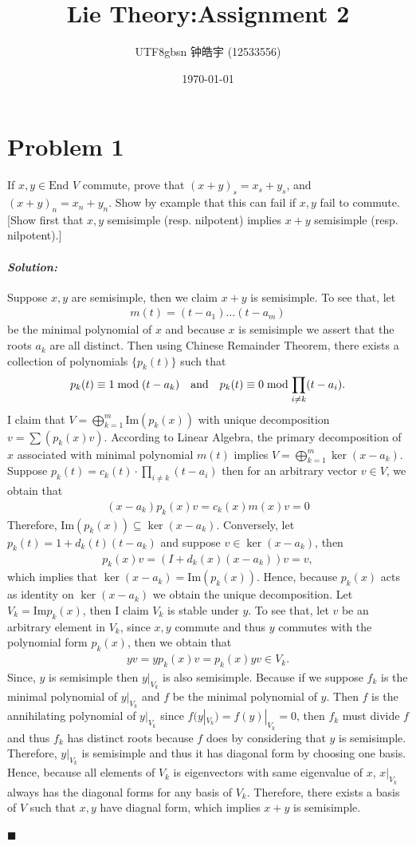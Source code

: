 \documentclass[12pt, a4paper]{article}
\title{Lie Theory:Assignment 2}
\author{
    \begin{CJK*}{UTF8}{gbsn}
    钟皓宇 (12533556)
    \end{CJK*}
}
\date{\today}
\newenvironment{solution}
  {\paragraph{\textit{Solution:}}\par\medskip}
  {\hfill$\blacksquare$\vspace{0.1cm}}
\begin{document}
\maketitle
\section*{Problem 1}
If $x, y \in \text{End } V$ commute, prove that $(x+y)_s = x_s + y_s$, and $(x+y)_n = x_n + y_n$. Show by example that this can fail if $x, y$ fail to commute. [Show first that $x, y$ semisimple (resp. nilpotent) implies $x + y$ semisimple (resp. nilpotent).]
\begin{solution}
Suppose $x,y$ are semisimple, then we claim $x+y$ is semisimple. To see that, let 
\begin{align*}
  m(t) =  (t-a_1)\dots(t-a_m)
\end{align*} 
be the minimal polynomial of $x$ and because $x$ is semisimple we assert that the roots $a_k$ are all distinct. Then using Chinese Remainder Theorem, there exists a collection of polynomials $\{p_k(t)\}$ such that 
\begin{align*}
  p_k(t)\equiv 1 \bmod (t-a_k) \text{\quad and\quad} p_k(t) \equiv 0 \bmod \prod_{i\neq k} (t-a_i).
\end{align*}
I claim that $V = \bigoplus_{k=1}^m \text{Im}(p_k(x))$ with unique decomposition $v = \sum (p_k(x)v)$. 
According to Linear Algebra, the primary decomposition of $x$ associated with minimal polynomial $m(t)$ 
implies $V=  \bigoplus_{k=1}^m \ker(x-a_k)$. Suppose $p_k(t) = c_k(t)\cdot\prod_{i\neq k} (t-a_i)$ then for an arbitrary vector $v\in V$, we obtain that
\begin{align*}
  (x-a_k)p_k(x)v  =c_k(x)m(x)v=0 
\end{align*}
Therefore, $\text{Im}(p_k(x))\subseteq \ker(x-a_k)$. Conversely, let $p_k(t) = 1+d_k(t)(t-a_k)$ and suppose $v\in\ker(x-a_k)$, then 
\begin{align*}
  p_k(x)v = (I+d_k(x)(x-a_k))v = v,
\end{align*}
which implies that $\ker(x-a_k)=\text{Im}(p_k(x))$. Hence, because $p_k(x)$ acts as identity on $\ker(x-a_k)$ we obtain the unique decomposition.
Let $V_k = \text{Im}p_k(x)$, then I claim $V_k$ is stable under $y$. To see that, let $v$ be an arbitrary element in $V_k$,
since $x,y$ commute and thus $y$ commutes with the polynomial form $p_k(x)$, then
we obtain that 
\begin{align*}
  yv = yp_k(x)v = p_k(x)yv\in V_k.
\end{align*}
Since, $y$ is semisimple then $y|_{V_k}$ is also semisimple. Because if we suppose $f_k$ is the minimal polynomial of $y|_{V_k}$ and $f$ be the minimal polynomial of $y$.
Then $f$ is the annihilating polynomial of $y|_{V_k}$ since $f(y|_{V_k})=f(y)|_{V_k}=0$, then $f_k$ must divide $f$ and thus $f_k$ has distinct roots because $f$ does by considering 
that $y$ is semisimple. Therefore, $y|_{V_k}$ is semisimple and thus it has diagonal form by choosing one basis. 
Hence, because all elements of $V_k$ is eigenvectors with same eigenvalue of $x$, $x|_{V_k}$ always has the diagonal forms for any basis of $V_k$. Therefore, there exists a basis of $V$
such that $x,y$ have diagnal form, which implies $x+y$ is semisimple.


\end{solution}
\end{document}
